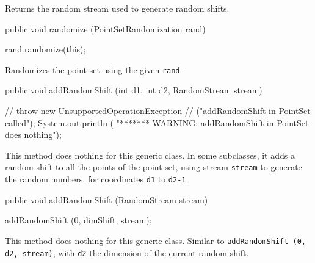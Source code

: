  \begin{tabb}
   Returns the random stream used to generate random shifts.
 \end{tabb}
\begin{htmlonly}
\end{htmlonly}
\begin{code}

   public void randomize (PointSetRandomization rand) \begin{hide} {
       rand.randomize(this);
   }\end{hide}
\end{code}
\begin{tabb}
   Randomizes the point set using the given \texttt{rand}.
\end{tabb}
\begin{htmlonly}
\end{htmlonly}
\begin{code}

   public void addRandomShift (int d1, int d2, RandomStream stream)\begin{hide} {
//   throw new UnsupportedOperationException
//         ("addRandomShift in PointSet called");
     System.out.println (
        "******* WARNING:  addRandomShift in PointSet does nothing");
   }\end{hide}
\end{code}
\begin{tabb}  This method does nothing for this generic class.
  In some subclasses, it adds a random shift to all the points
  of the point set, using stream \texttt{stream} to generate the random numbers,
  for coordinates \texttt{d1} to \texttt{d2-1}.
\end{tabb}
\begin{code}

   public void addRandomShift (RandomStream stream)\begin{hide} {
      addRandomShift (0, dimShift, stream);
  }\end{hide}
\end{code}
\begin{tabb}  This method does nothing for this generic class.
 Similar to \texttt{addRandomShift (0, d2, stream)},
  with \texttt{d2} the dimension of the current random shift.
\end{tabb}
